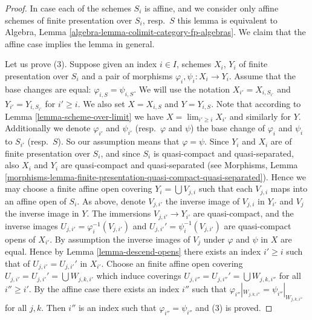 \documentclass{stacks-project}
\theoremstyle{plain}
\theoremstyle{definition}
\theoremstyle{remark}
\numberwithin{equation}{subsection}
\def\lim{\mathop{\mathrm{lim}}\nolimits}
\begin{document}
\begin{proof}
In case each of the schemes $S_i$ is affine, and we consider
only affine schemes of finite presentation over $S_i$, resp.\ $S$
this lemma is equivalent to
Algebra, Lemma \ref{algebra-lemma-colimit-category-fp-algebras}.
We claim that the affine case implies the lemma in general.

\medskip\noindent
Let us prove (3). Suppose given an index $i \in I$, schemes
$X_i$, $Y_i$ of finite presentation over $S_i$ and a pair of morphisms
$\varphi_i, \psi_i : X_i \to Y_i$. Assume that the base changes are
equal: $\varphi_{i, S} = \psi_{i, S}$. We will use the notation
$X_{i'} = X_{i, S_{i'}}$ and $Y_{i'} = Y_{i, S_{i'}}$ for
$i' \geq i$. We also set $X = X_{i, S}$ and $Y = Y_{i, S}$.
Note that according to Lemma \ref{lemma-scheme-over-limit} we have
$X = \lim_{i' \geq i} X_{i'}$ and similarly for $Y$.
Additionally we denote $\varphi_{i'}$ and $\psi_{i'}$
(resp.\ $\varphi$ and $\psi$)
the base change of $\varphi_i$ and $\psi_i$ to $S_{i'}$
(resp.\ $S$). So our assumption means that $\varphi = \psi$.
Since $Y_i$ and $X_i$ are of finite presentation
over $S_i$, and since $S_i$ is quasi-compact and quasi-separated, also
$X_i$ and $Y_i$ are quasi-compact and quasi-separated
(see Morphisms,
Lemma \ref{morphisms-lemma-finite-presentation-quasi-compact-quasi-separated}).
Hence we may choose a finite affine open covering
$Y_i = \bigcup V_{j, i}$ such that each $V_{j, i}$ maps into
an affine open of $S_i$. As above, denote $V_{j, i'}$ the inverse
image of $V_{j, i}$ in $Y_{i'}$ and $V_j$ the inverse image in $Y$.
The immersions $V_{j, i'} \to Y_{i'}$ are quasi-compact, and the inverse images
$U_{j, i'} = \varphi_i^{-1}(V_{j, i'})$ and
$U_{j, i'}' = \psi_i^{-1}(V_{j, i'})$
are quasi-compact opens of $X_{i'}$. By assumption the inverse images of
$V_j$ under $\varphi$ and $\psi$ in $X$ are equal.
Hence by Lemma \ref{lemma-descend-opens}
there exists an index $i' \geq i$ such that
of $U_{j, i'} = U_{j, i'}'$ in $X_{i'}$.
Choose an finite affine open covering
$U_{j, i'} = U_{j, i'}' = \bigcup W_{j, k, i'}$
which induce coverings $U_{j, i''} = U_{j, i''}' = \bigcup W_{j, k, i''}$
for all $i'' \geq i'$.
By the affine case there exists
an index $i''$ such that
$\varphi_{i''}|_{W_{j, k, i''}} = \psi_{i''}|_{W_{j, k, i''}}$
for all $j, k$. Then $i''$ is an index such that
$\varphi_{i''} = \psi_{i''}$ and (3) is proved.


\end{proof}
\end{document}
